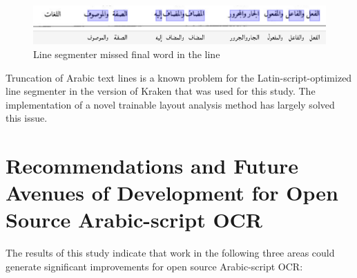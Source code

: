 \begin{figure}[h]
	\centering
	\includegraphics[width=\linewidth]{images/image4.png}
	\caption{Line segmenter missed final word in the line}
	\label{fig3:fig31}
\end{figure} 

Truncation of Arabic text lines is a known problem for the
Latin-script-optimized line segmenter in the version of Kraken that was used
for this study. The implementation of a novel trainable layout analysis method
has largely solved this issue\cite{kiessling2019badam}.

\section{Recommendations and Future Avenues of Development for Open Source Arabic-script OCR}

The results of this study indicate that work in the following three areas could
generate significant improvements for open source Arabic-script OCR: 

